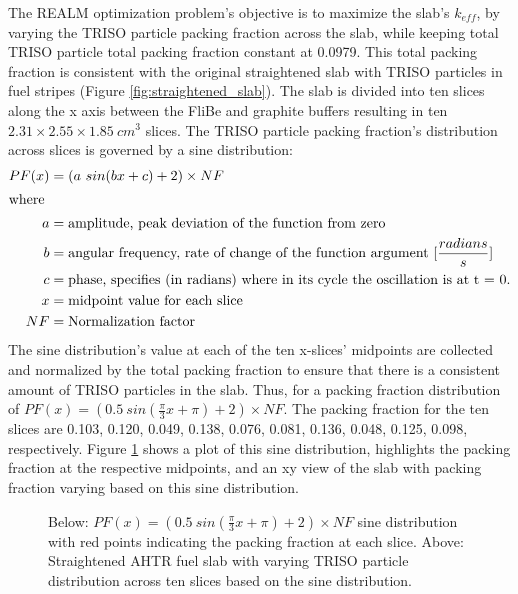 The \gls{REALM} optimization problem's objective is to maximize the slab's 
$k_{eff}$, by varying the \gls{TRISO} particle packing fraction across the slab,
while keeping total \gls{TRISO} particle total packing fraction constant at 0.0979. 
This total packing fraction is consistent with the original straightened slab with 
TRISO particles in fuel stripes (Figure \ref{fig:straightened_slab}). 
The slab is divided into ten slices along the x axis between the FliBe and graphite 
buffers resulting in ten $2.31 \times 2.55 \times 1.85\ cm^3$ slices. 
The \gls{TRISO} particle packing fraction's distribution across slices is 
governed by a sine distribution: 
\begin{align}
    PF(x) &= (a\ sin(bx + c) + 2) \times NF\\
    \intertext{where}
    a &= \mbox{amplitude, peak deviation of the function from zero} \nonumber \\
    b &= \mbox{angular frequency, rate of change of the function argument } [\frac{radians}{s}] \nonumber \\
    c &= \mbox{phase, specifies (in radians) where in its cycle the oscillation is at t = 0.} \nonumber \\
    x &= \mbox{midpoint value for each slice} \nonumber \\
    NF &= \mbox{Normalization factor} \nonumber
\end{align}
The sine distribution's value at each of the ten x-slices' midpoints are collected and 
normalized by the total packing fraction to ensure that there is a consistent 
amount of \gls{TRISO} particles in the slab. 
Thus, for a packing fraction distribution of 
$PF(x) = (0.5\ sin(\frac{\pi}{3}x + \pi) + 2)  \times NF$. 
The packing fraction for the ten slices are 0.103, 0.120, 0.049, 0.138, 
0.076, 0.081, 0.136, 0.048, 0.125, 0.098, respectively. 
Figure \ref{fig:triso_distribution} shows a plot of this sine distribution, highlights 
the packing fraction at the respective midpoints, and an xy view of the slab
with packing fraction varying based on this sine distribution. 
\begin{figure}[]
    \centering
    \caption{Below: $PF(x) = (0.5\ sin(\frac{\pi}{3}x + \pi) + 2)  \times NF$ 
    sine distribution with red points indicating the packing fraction at each slice. 
    Above: Straightened \acrlong{AHTR} fuel slab with varying \gls{TRISO} particle 
    distribution across ten slices based on the sine distribution. }
    \label{fig:triso_distribution}
\end{figure}
